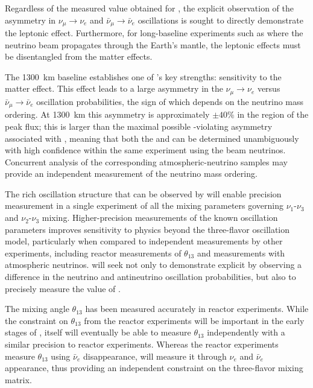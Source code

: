 Regardless of the measured value obtained for \deltacp, the explicit
observation of the asymmetry in $\nu_{\mu}
\rightarrow \nu_e$ and $\bar{\nu}_{\mu} \rightarrow
\bar{\nu}_e$ oscillations is sought to directly demonstrate the
leptonic  effect.  
Furthermore, for long-baseline
experiments such as  where the neutrino beam propagates through
the Earth's mantle, the leptonic  effects must be
disentangled from the matter effects.

The \SI{1300}{\km} baseline establishes one of 's key strengths: sensitivity to the matter effect. This effect leads to a large asymmetry in the $\nu_\mu\to \nu_e$ versus $\bar{\nu}_\mu \to \bar{\nu}_e$ oscillation probabilities, the sign of which depends on the neutrino mass ordering.  At \SI{1300}{\km} this asymmetry is approximately $\pm 40\%$ in the region of the peak flux; this is larger than the maximal possible -violating asymmetry associated with \deltacp, meaning that both the  and \deltacp can be determined
unambiguously with high confidence within the same experiment using the beam neutrinos. Concurrent analysis of the corresponding atmospheric-neutrino samples may provide an independent measurement of the neutrino mass ordering.

The rich oscillation structure that can be observed by  will enable precision measurement  in a single experiment of all the mixing parameters governing $\nu_1$-$\nu_3$ and $\nu_2$-$\nu_3$ mixing. Higher-precision measurements of the known oscillation parameters improves sensitivity to physics beyond the three-flavor oscillation model, particularly when compared to independent measurements by other experiments, including reactor measurements of $\theta_{13}$ and
measurements with atmospheric neutrinos.  will seek not only to demonstrate explicit  by observing a difference in the neutrino and antineutrino oscillation probabilities, but also to precisely measure the value of \deltacp. 

 The mixing angle $\theta_{13}$ has been measured accurately in reactor experiments. While the constraint on $\theta_{13}$ from the reactor experiments will be important in the
early stages of , 
 itself will eventually be able to measure
$\theta_{13}$ independently with a similar precision to reactor experiments. 
Whereas the reactor experiments measure $\theta_{13}$ using $\bar{\nu}_e$ disappearance,  will measure it through $\nu_e$ and $\bar{\nu}_e$ appearance, thus providing an independent constraint on
the three-flavor mixing matrix.   

